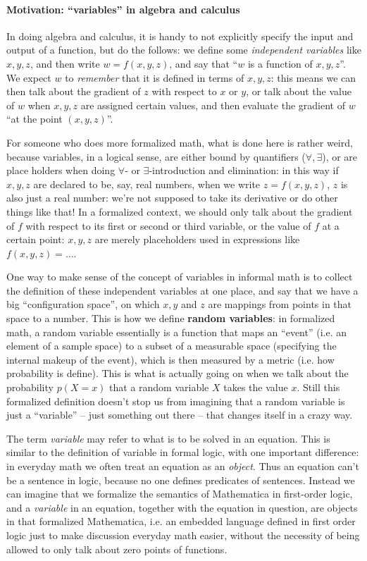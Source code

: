 \documentclass[hyperref, a4paper, 12pt]{report}
\newcommand*{\concept}[1]{{\textbf{#1}}}
\newcommand*{\term}[1]{\textit{#1}}
\begin{document}
\paragraph*{Motivation: ``variables'' in algebra and calculus}
In doing algebra and calculus, it is handy to not explicitly specify the input and output of a function, but do the follows:
we define some \emph{independent variables} like $x, y, z$,
and then write $w = f(x, y, z)$, and say that ``$w$ is a function of $x, y, z$''.
We expect $w$ to \emph{remember} that it is defined in terms of $x, y, z$:
this means we can then talk about the gradient of $z$ with respect to $x$ or $y$,
or talk about the value of $w$ when $x, y, z$ are assigned certain values,
and then evaluate the gradient of $w$ ``at the point $(x, y, z)$''.

For someone who does more formalized math,
what is done here is rather weird, because variables, in a logical sense,
are either bound by quantifiers ($\forall, \exists$),
or are place holders when doing $\forall$- or $\exists$-introduction and elimination:
in this way if $x, y, z$ are declared to be, say, real numbers,
when we write $z = f(x, y, z)$,
$z$ is also just a real number:
we're not supposed to take its derivative or do other things like that!
In a formalized context, we should only talk about the gradient of $f$ with respect to its first or second or third variable,
or the value of $f$ at a certain point:
$x, y ,z$ are merely placeholders used in expressions like $f(x, y, z) = \dots$.

One way to make sense of the concept of variables in informal math is 
to collect the definition of these independent variables at one place,
and say that we have a big ``configuration space'',
on which $x, y$ and $z$ are mappings from points in that space to a number.
This is how we define \concept{random variables}:
in formalized math, a random variable essentially is a function that maps an ``event'' (i.e. an element of a sample space) to a subset of a measurable space (specifying the internal makeup of the event),
which is then measured by a metric (i.e. how probability is define).
This is what is actually going on when we talk about the probability $p(X=x)$ that a random variable $X$ takes the value $x$.
Still this formalized definition doesn't stop us from imagining that a random variable is just a ``variable'' -- just something out there -- that changes itself in a crazy way.

The term \term{variable} may refer to what is to be solved in an equation.
This is similar to the definition of variable in formal logic,
with one important difference:
in everyday math we often treat an equation as an \emph{object}.
Thus an equation can't be a sentence in logic,
because no one defines predicates of sentences.
Instead we can imagine that we formalize the semantics of Mathematica in first-order logic,
and a \emph{variable} in an equation, together with the equation in question,
are objects in that formalized Mathematica,
i.e. an embedded language defined in first order logic
just to make discussion everyday math easier,
without the necessity of being allowed to only talk about zero points of functions.
\end{document}
